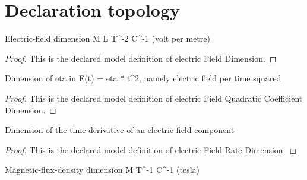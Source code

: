 \section{Declaration topology}
\begin{definition}
  \label{def:physics:phyx-mini-0983:phyxminiproblems-problemphyxmini0983-electricfielddimension}
  Electric-field dimension M L T\textasciicircum{}-2 C\textasciicircum{}-1 (volt per metre)
\end{definition}
\begin{proof}
  This is the declared model definition of electric Field Dimension.
\end{proof}
\begin{definition}
  \label{def:physics:phyx-mini-0983:phyxminiproblems-problemphyxmini0983-electricfieldquadraticcoefficientdimension}
  Dimension of eta in E(t) = eta * t\textasciicircum{}2, namely electric field per time squared
\end{definition}
\begin{proof}
  This is the declared model definition of electric Field Quadratic Coefficient Dimension.
\end{proof}
\begin{definition}
  \label{def:physics:phyx-mini-0983:phyxminiproblems-problemphyxmini0983-electricfieldratedimension}
  Dimension of the time derivative of an electric-field component
\end{definition}
\begin{proof}
  This is the declared model definition of electric Field Rate Dimension.
\end{proof}
\begin{definition}
  \label{def:physics:phyx-mini-0983:phyxminiproblems-problemphyxmini0983-magneticfluxdensitydimension}
  Magnetic-flux-density dimension M T\textasciicircum{}-1 C\textasciicircum{}-1 (tesla)
\end{definition}
